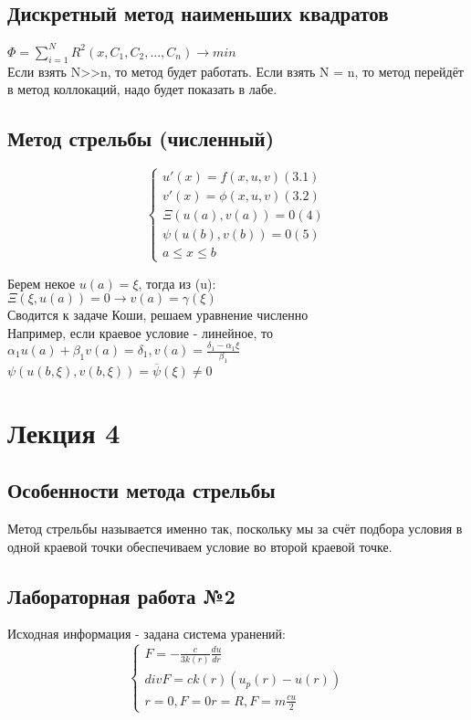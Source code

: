 \section{Дискретный метод наименьших квадратов}
$\Phi = \sum\limits_{i=1}^{N} R^{2}(x, C_{1}, C_{2}, ..., C_{n}) \rightarrow min$\\
Если взять N>>n, то метод будет работать. Если взять N = n, то метод перейдёт в метод коллокаций, надо будет показать в лабе.

\section{Метод стрельбы (численный)}
\begin{equation}
\begin{cases}
u'(x) = f(x, u, v) (3.1)\\
v'(x) = \phi(x, u, v) (3.2)\\
\Xi(u(a), v(a)) = 0 (4)\\
\psi(u(b), v(b)) = 0 (5)\\
a \leqslant x \leqslant b
\end{cases}
\end{equation}

Берем некое $u(a) = \xi$, тогда из (u):\\
$\Xi(\xi, u(a)) = 0 \rightarrow v(a) = \gamma(\xi)$\\
Сводится к задаче Коши, решаем уравнение численно\\
Например, если краевое условие - линейное, то $\alpha_{1} u(a) + \beta_{1}v(a) = \delta_{1}, v(a) = \frac{\delta_{1} - \alpha_{1} \xi}{\beta_{1}}$\\

$\psi(u(b, \xi), v(b, \xi)) = \overline{\psi}(\xi) \neq 0$\\

\chapter{Лекция 4}
\section{Особенности метода стрельбы}
Метод стрельбы называется именно так, поскольку мы за счёт подбора условия в одной краевой точки обеспечиваем условие во второй краевой точке.

\section{Лабораторная работа №2}
Исходная информация - задана система уранений:\\
\begin{equation}
\begin{cases}
F = -\frac{c}{3k(r)} \frac{du}{dr}\\
div F = c k (r) (u_{p}(r) - u(r))\\
r = 0, F= 0
r = R, F = m \frac{cu}{2}
\end{cases}
\end{equation}

